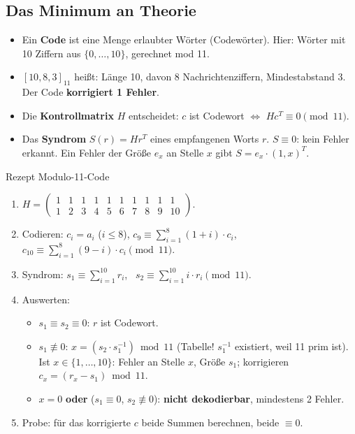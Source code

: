 \subsection*{Das Minimum an Theorie}
\begin{itemize}
\item Ein \textbf{Code} ist eine Menge erlaubter Wörter (Codewörter). Hier: Wörter mit 10 Ziffern aus $\{0, \dots, 10\}$, gerechnet mod 11.
\item $[10, 8, 3]_{11}$ heißt: Länge 10, davon 8 Nachrichtenziffern, Mindestabstand 3. Der Code \textbf{korrigiert 1 Fehler}.
\item Die \textbf{Kontrollmatrix} $H$ entscheidet: $c$ ist Codewort $\Leftrightarrow$ $H c^T \equiv 0 \pmod{11}$.
\item Das \textbf{Syndrom} $S(r) = H r^T$ eines empfangenen Worts $r$. $S \equiv 0$: kein Fehler erkannt.
      Ein Fehler der Größe $e_x$ an Stelle $x$ gibt $S = e_x \cdot (1, x)^T$.
\end{itemize}

\begin{rezept}{Rezept Modulo-11-Code}
\begin{enumerate}
\item $H = \begin{pmatrix} 1&1&1&1&1&1&1&1&1&1\\ 1&2&3&4&5&6&7&8&9&10 \end{pmatrix}$.
\item Codieren: $c_i = a_i$ ($i \le 8$), $c_9 \equiv \sum_{i=1}^{8} (1+i) \cdot c_i$, \ $c_{10} \equiv \sum_{i=1}^{8} (9-i) \cdot c_i \pmod{11}$.
\item Syndrom: $s_1 \equiv \sum_{i=1}^{10} r_i$, \ $s_2 \equiv \sum_{i=1}^{10} i \cdot r_i \pmod{11}$.
\item Auswerten:
  \begin{itemize}
  \item $s_1 \equiv s_2 \equiv 0$: $r$ ist Codewort.
  \item $s_1 \not\equiv 0$: $x = (s_2 \cdot s_1^{-1}) \bmod 11$ (Tabelle! $s_1^{-1}$ existiert, weil 11 prim ist). Ist $x \in \{1, \dots, 10\}$: Fehler an Stelle $x$, Größe $s_1$;
        korrigieren $c_x = (r_x - s_1) \bmod 11$.
  \item $x = 0$ \textbf{oder} ($s_1 \equiv 0$, $s_2 \not\equiv 0$): \textbf{nicht dekodierbar}, mindestens 2 Fehler.
  \end{itemize}
\item Probe: für das korrigierte $c$ beide Summen berechnen, beide $\equiv 0$.
\end{enumerate}
\end{rezept}

